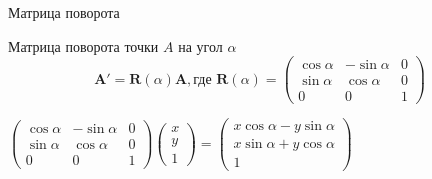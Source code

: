\documentclass[10pt]{beamer}
\begin{document}
\begin{frame}{Матрица поворота}
	
	\begin{block}{Матрица поворота точки $A$ на угол $\alpha$}
		$$
		\textbf{A}' =\textbf{R}(\alpha) \textbf{A}, \text{где } \textbf{R}(\alpha) =
		\begin{pmatrix}
			\cos\alpha&-\sin\alpha&0\\
			\sin\alpha&\cos\alpha&0\\
			0&0&1
		\end{pmatrix} 
		$$
	\end{block}
	
	$
		\begin{pmatrix}
			\cos\alpha&-\sin\alpha&0\\
			\sin\alpha&\cos\alpha&0\\
			0&0&1
		\end{pmatrix} 
		\begin{pmatrix}
			x\\
			y\\
			1
		\end{pmatrix}
		=
		\begin{pmatrix}
			x\cos\alpha - y\sin\alpha\\
			x\sin\alpha + y\cos\alpha\\
			1
		\end{pmatrix}
	$
	
\end{frame}
\end{document}

